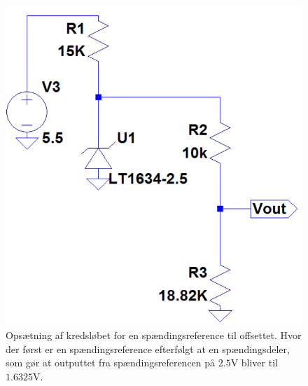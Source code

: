\begin{figure}[H]
	\centering
	\includegraphics[scale=.5]{figures/cProblemloesning/OffsetSpaendingsRef2.PNG}
	\caption{Opsætning af kredsløbet for en spændingsreference til offsettet. Hvor der først er en spændingsreference efterfølgt at en spændingsdeler, som gør at outputtet fra spændingsreferencen på $2.5$V bliver til $1.6325$V. }
	\label{fig:Spaendingsreference_offset}
\end{figure}

